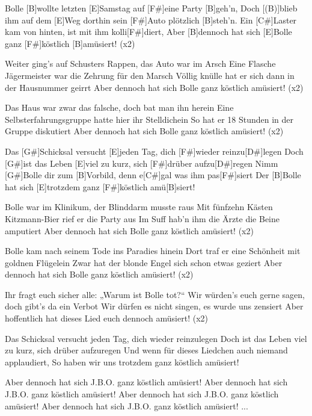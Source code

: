 

\begin{guitar}
	Bolle [B]wollte letzten [E]Samstag auf [F#]eine Party [B]geh’n,
	Doch [(B)]blieb ihm auf dem [E]Weg dorthin sein [F#]Auto plötzlich [B]steh’n.
	Ein [C#]Laster kam von hinten, ist mit ihm kolli[F#]diert,
	Aber [B]dennoch hat sich [E]Bolle ganz [F#]köstlich [B]amüsiert! (x2)
	
	Weiter ging’s auf Schusters Rappen, das Auto war im Arsch
	Eine Flasche Jägermeister war die Zehrung für den Marsch
	Völlig knülle hat er sich dann in der Hausnummer geirrt
	Aber dennoch hat sich Bolle ganz köstlich amüsiert! (x2)
	
	Das Haus war zwar das falsche, doch bat man ihn herein
	Eine Selbsterfahrungsgruppe hatte hier ihr Stelldichein
	So hat er 18 Stunden in der Gruppe diskutiert
	Aber dennoch hat sich Bolle ganz köstlich amüsiert! (x2)
	
	Das [G#]Schicksal versucht [E]jeden Tag, dich [F#]wieder reinzu[D#]legen
	Doch [G#]ist das Leben [E]viel zu kurz, sich [F#]drüber aufzu[D#]regen
	Nimm [G#]Bolle dir zum [B]Vorbild, denn e[C#]gal was ihm pas[F#]siert
	Der [B]Bolle hat sich [E]trotzdem ganz [F#]köstlich amü[B]siert! 
	
	Bolle war im Klinikum, der Blinddarm musste raus
	Mit fünfzehn Kästen Kitzmann-Bier rief er die Party aus
	Im Suff hab'n ihm die Ärzte die Beine amputiert
	Aber dennoch hat sich Bolle ganz köstlich amüsiert! (x2)
	
	Bolle kam nach seinem Tode ins Paradies hinein
	Dort traf er eine Schönheit mit goldnen Flügelein
	Zwar hat der blonde Engel sich schon etwas geziert
	Aber dennoch hat sich Bolle ganz köstlich amüsiert! (x2)
	
	 
	\pagebreak
	Ihr fragt euch sicher alle: „Warum ist Bolle tot?“
	Wir würden's euch gerne sagen, doch gibt’s da ein Verbot
	Wir dürfen es nicht singen, es wurde uns zensiert
	Aber hoffentlich hat dieses Lied euch dennoch amüsiert! (x2)
	
	Das Schicksal versucht jeden Tag, dich wieder reinzulegen
	Doch ist das Leben viel zu kurz, sich drüber aufzuregen
	Und wenn für dieses Liedchen auch niemand applaudiert,
	So haben wir uns trotzdem ganz köstlich amüsiert!

	Aber dennoch hat sich J.B.O. ganz köstlich amüsiert!
	Aber dennoch hat sich J.B.O. ganz köstlich amüsiert!
	Aber dennoch hat sich J.B.O. ganz köstlich amüsiert!
	Aber dennoch hat sich J.B.O. ganz köstlich amüsiert!
	...	
	
\end{guitar}